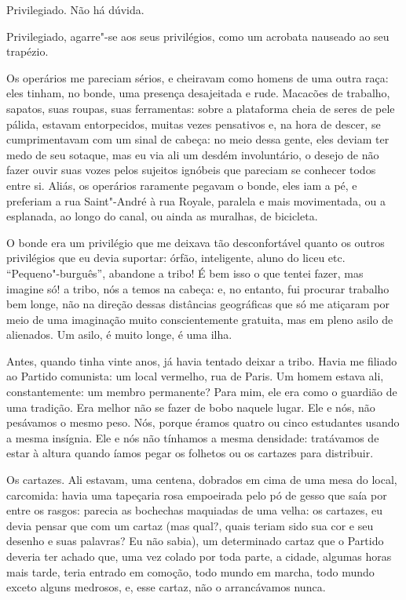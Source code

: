 Privilegiado. Não há dúvida.

Privilegiado, agarre"-se aos seus privilégios, como um acrobata nauseado
ao seu trapézio.

Os operários me pareciam sérios, e cheiravam como homens de uma outra
raça: eles tinham, no bonde, uma presença desajeitada e rude. Macacões
de trabalho, sapatos, suas roupas, suas ferramentas: sobre a plataforma
cheia de seres de pele pálida, estavam entorpecidos, muitas vezes
pensativos e, na hora de descer, se cumprimentavam com um sinal de
cabeça: no meio dessa gente, eles deviam ter medo de seu sotaque, mas eu
via ali um desdém involuntário, o desejo de não fazer ouvir suas vozes
pelos sujeitos ignóbeis que pareciam se conhecer todos entre si. Aliás,
os operários raramente pegavam o bonde, eles iam a pé, e preferiam a rua
Saint"-André à rua Royale, paralela e mais movimentada, ou a esplanada,
ao longo do canal, ou ainda as muralhas, de bicicleta.

O bonde era um privilégio que me deixava tão desconfortável quanto os
outros privilégios que eu devia suportar: órfão, inteligente, aluno do
liceu etc. ``Pequeno"-burguês'', abandone a tribo! É bem isso o que
tentei fazer, mas imagine só! a tribo, nós a temos na cabeça: e, no
entanto, fui procurar trabalho bem longe, não na direção dessas
distâncias geográficas que só me atiçaram por meio de uma imaginação
muito conscientemente gratuita, mas em pleno asilo de alienados. Um
asilo, é muito longe, é uma ilha.

Antes, quando tinha vinte anos, já havia tentado deixar a tribo. Havia
me filiado ao Partido comunista: um local vermelho, rua de Paris. Um
homem estava ali, constantemente: um membro permanente? Para mim, ele
era como o guardião de uma tradição. Era melhor não se fazer de bobo
naquele lugar. Ele e nós, não pesávamos o mesmo peso. Nós, porque éramos
quatro ou cinco estudantes usando a mesma insígnia. Ele e nós não
tínhamos a mesma densidade: tratávamos de estar à altura quando íamos
pegar os folhetos ou os cartazes para distribuir.

Os cartazes. Ali estavam, uma centena, dobrados em cima de uma mesa do
local, carcomida: havia uma tapeçaria rosa empoeirada pelo pó de gesso
que saía por entre os rasgos: parecia as bochechas maquiadas de uma
velha: os cartazes, eu devia pensar que com um cartaz (mas qual?, quais
teriam sido sua cor e seu desenho e suas palavras? Eu não sabia), um
determinado cartaz que o Partido deveria ter achado que, uma vez colado
por toda parte, a cidade, algumas horas mais tarde, teria entrado
em comoção, todo mundo em marcha, todo mundo exceto alguns medrosos, e,
esse cartaz, não o arrancávamos nunca.

